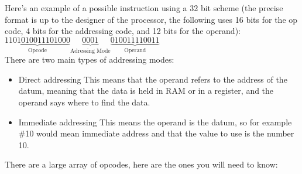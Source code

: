   Here's an example of a possible instruction using a 32 bit scheme (the precise format is up to the designer of the processor, the following uses 16 bits for the op code, 4 bits for the addressing code, and 12 bits for the operand):
  \(\underbrace{1101010011101000}_{\text{Opcode}}\underbrace{0001}_{\text{Adressing Mode}}\underbrace{010011110011}_{\text{Operand}}\) \\
  There are two main types of addressing modes:
  \begin{itemize}
    \item Direct addressing
      \subitem This means that the operand refers to the address of the datum, meaning that the data is held in RAM or in a register, and the operand says where to find the data.
    \item Immediate addressing
      \subitem This means the operand is the datum, so for example \#10 would mean immediate address and that the value to use is the number 10.
  \end{itemize}
  There are a large array of opcodes, here are the ones you will need to know:
